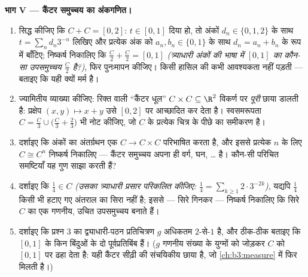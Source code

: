 \begin{problem}
\medskip
\noindent\textbf{भाग V --- कैंटर समुच्चय का अंकगणित।}
\begin{enumerate}[resume]
  \item सिद्ध कीजिए कि $C + C = [0, 2]$: $t \in [0, 1]$ दिया हो, तो अंकों $d_n \in \{0,
        1, 2\}$ के
        साथ $t = \sum_n d_n3^{-n}$ लिखिए और प्रत्येक अंक को $a_n, b_n \in \{0, 1\}$ के साथ $d_n = a_n + b_n$ के
        रूप में बाँटिए; निष्कर्ष निकालिए कि $\frac C2 +
        \frac C2 = [0, 1]$ \emph{(त्र्याधारी
        अंकों की भाषा में $[0,1]$ का कौन-सा उपसमुच्चय $\frac C2$ है?)},
        फिर पुनःमापन कीजिए। किसी हासिल की कभी आवश्यकता नहीं पड़ती
        --- बताइए कि यही क्यों मर्म है।
  \item ज्यामितीय व्याख्या कीजिए: रिक्त  वाली ``कैंटर
        धूल'' $C \times
        C \subseteq \R^2$ विकर्ण पर \emph{पूरी} छाया डालती है: प्रक्षेप
        $(x,
        y) \mapsto x + y$ उसे $[0, 2]$ पर आच्छादित कर देता है। स्वसमरूपता
        $C = \frac C3 \cup \bigl(\frac C3 +
        \frac23\bigr)$ भी नोट कीजिए, जो $C$ के प्रत्येक चित्र के पीछे का
        समीकरण है।
  \item दर्शाइए कि अंकों का अंतर्ग्रथन एक  $C
        \to C \times C$
        परिभाषित करता है, और इससे प्रत्येक $n$ के लिए $C \cong C^n$
        निष्कर्ष निकालिए --- कैंटर समुच्चय अपना ही वर्ग, घन,
        \dots{} है। कौन-सी परिचित समष्टियाँ यह गुण साझा करती हैं?
  \item दर्शाइए कि $\frac14 \in C$ \emph{(उसका त्र्याधारी प्रसार परिकलित
        कीजिए: $\frac14 = \sum_{k\geq1} 2\cdot3^{-2k}$)}, यद्यपि $\frac14$ किसी भी हटाए गए अंतराल का
        सिरा नहीं है; इससे --- सिरे गिनकर --- निष्कर्ष निकालिए
        कि सिरे $C$ का एक गणनीय, उचित उपसमुच्चय बनाते हैं।
  \item दर्शाइए कि प्रश्न 3 का द्व्याधारी-पठन प्रतिचित्रण $g$
        अधिकतम $2$-से-$1$ है, और ठीक-ठीक बताइए कि $[0,1]$ के
        किन बिंदुओं के दो पूर्वप्रतिबिंब हैं। ($g$ गणनीय संख्या
        के युग्मों को जोड़कर $C$ को $[0,1]$ पर ढहा देता है: यही
        कैंटर सीढ़ी की संचयिकीय छाया है, जो \cref{ch:b3:measure} में फिर मिलती
        है।)
\end{enumerate}


\end{problem}
